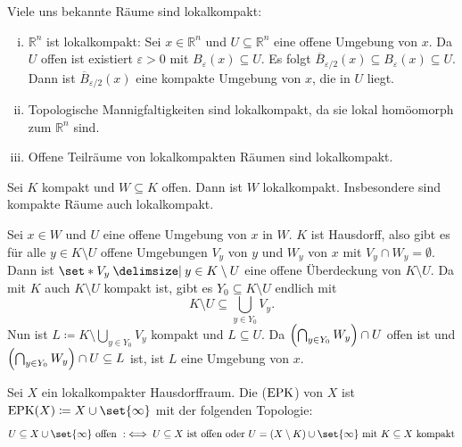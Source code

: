 \begin{beispiel}[{name=[lokalkompakte Räume]}]
	Viele uns bekannte Räume sind lokalkompakt:
	\begin{enumerate}[(i)]
		\item $\mathbb{R}^n$ ist lokalkompakt: Sei $x \in \mathbb{R}^n$ und $U \subseteq \mathbb{R}^n$ eine offene Umgebung von $x$. 
		Da $U$ offen ist existiert $\varepsilon >0$ mit $B_\varepsilon(x) \subseteq U$. 
		Es folgt $\overline{B}_{\varepsilon/2}(x) \subseteq B_\varepsilon(x) \subseteq U$. 
		Dann ist $\overline{B}_{\varepsilon/2}(x)$ eine kompakte Umgebung von $x$, die in $U$ liegt.
		\item Topologische Mannigfaltigkeiten sind lokalkompakt, da sie lokal homöomorph zum $\mathbb{R}^n$ sind.
		\item Offene Teilräume von lokalkompakten Räumen sind lokalkompakt.
	\end{enumerate}
\end{beispiel}

\begin{proposition}[{name=[Offene Teilräume kompakter Räume sind lokalkompakt]}]
	Sei $K$ kompakt und $W \subseteq K$ offen. Dann ist $W$ lokalkompakt. 
	Insbesondere sind kompakte Räume auch lokalkompakt.
\end{proposition}
\begin{beweis}
	Sei $x \in W$ und $U$ eine offene Umgebung von $x$ in $W$. 
	$K$ ist Hausdorff, also gibt es für alle $y \in K \setminus U$ offene Umgebungen $V_y$ von $y$ und $W_y$ von 
	$x$ mit $V_y \cap W_y = \emptyset$. 
	Dann ist $\set*{V_y \given y \in K \setminus U}$ eine offene Überdeckung von $K \setminus U$. 
	Da mit $K$ auch $K \setminus U$ kompakt ist, gibt es $Y_0 \subseteq K\setminus U$ endlich mit 
	\[
		K\setminus U \subseteq \bigcup_{y \in Y_0} V_y.
	\]
	Nun ist $L \coloneqq K \setminus \bigcup_{y \in Y_0} V_y$ kompakt und $L \subseteq U$. 
	Da $\enbrace*{\bigcap_{y \in Y_0} W_y} \cap U$ offen ist und $\enbrace*{\bigcap_{y \in Y_0} W_y} \cap U \subseteq L$ ist, ist $L$ eine Umgebung von $x$.
\end{beweis}

\begin{definition}[{name=[Einpunktkompaktifizierung]}]
	Sei $X$ ein lokalkompakter Hausdorffraum. 
	Die  ($\EPK$) von $X$ ist $\EPK(X) \coloneqq X \cup \set{\infty}$ mit der folgenden Topologie:
	\[
		U \subseteq X \cup \set{\infty} \text{ offen } :\iff U \subseteq X \text{ ist offen oder } U= (X \setminus K) \cup \set{\infty} \text{ mit } K \subseteq X \text{ kompakt}  
	\]
\end{definition}

